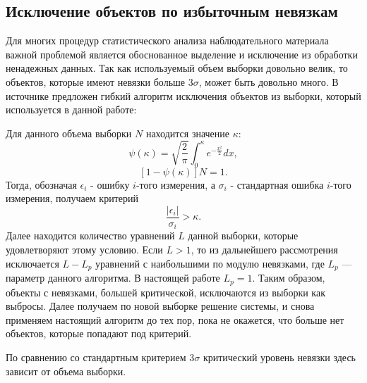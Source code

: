 \documentclass{matmex-diploma-custom}
\begin{document}
\subsection{Исключение объектов по избыточным невязкам} \label{err_filter}
Для многих процедур статистического анализа наблюдательного материала важной проблемой является обоснованное выделение и исключение из обработки ненадежных данных. Так как используемый объем выборки довольно велик, то объектов, которые имеют невязки больше $3\sigma$, может быть довольно много. В источнике \cite{9} предложен гибкий алгоритм исключения объектов из выборки, который используется в данной работе:

\par Для данного объема выборки $N$ находится значение $\kappa$:
\begin{equation}
\psi (\kappa) = \sqrt{\frac{2}{\pi}} \int_0^{\kappa} e^{- \frac{x^2}{2}} dx,
\end{equation}
\begin{equation}
\left[ 1 - \psi (\kappa) \right] N = 1.
\end{equation}
Тогда, обозначая $\epsilon_i$ - ошибку $i$-того измерения, а $\sigma_i$ - стандартная ошибка $i$-того измерения, получаем критерий
\begin{equation} \label{criteria}
\frac{\left| \epsilon_i \right|}{\sigma_i} > \kappa.
\end{equation}
Далее находится количество уравнений $L$ данной выборки, которые удовлетворяют этому условию. Если $L > 1$, то из дальнейшего рассмотрения исключается $L - L_p$ уравнений с наибольшими по модулю невязками, где $L_p$ — параметр данного алгоритма.  В настоящей работе $L_p = 1$. Таким образом, объекты с невязками, большей критической, исключаются из выборки как выбросы. Далее получаем по новой выборке решение системы, и снова применяем настоящий алгоритм до тех пор, пока не окажется, что больше нет объектов, которые попадают под критерий.
\par По сравнению со стандартным критерием $3\sigma$ критический уровень невязки здесь зависит от объема выборки.
\end{document}
